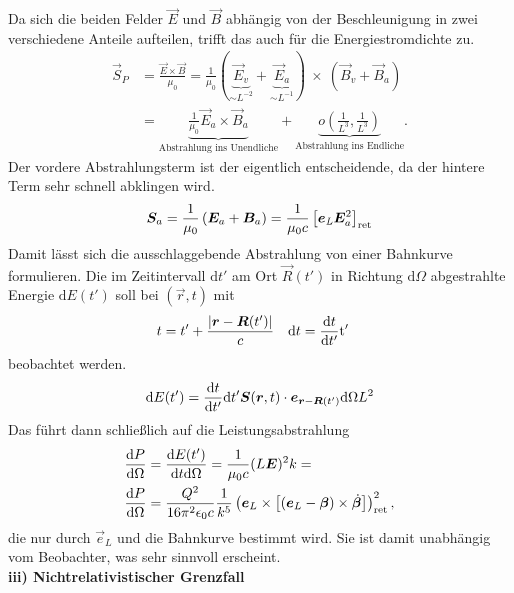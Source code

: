 Da sich die beiden Felder $\vec{E}$ und $\vec{B}$ abhängig von der Beschleunigung in zwei verschiedene Anteile aufteilen, trifft das auch für die Energiestromdichte zu.
\begin{align*}
\vec{S}_P &= \frac{\vec{E}\times\vec{B}}{\mu_0} = \frac{1}{\mu_0}(\underbrace{\vec{E}_v}_{\sim L^{-2}}+\underbrace{\vec{E}_a}_{\sim L^{-1}}) \ \times \ (\vec{B}_v+\vec{B}_a) \\
&=\underbrace{\frac{1}{\mu_0}\vec{E}_a\times\vec{B}_a}_{\text{Abstrahlung ins Unendliche}} + \underbrace{o\left(\frac{1}{L^3},\frac{1}{L^3}\right)}_{\text{Abstrahlung ins Endliche}}.
\end{align*}
Der vordere Abstrahlungsterm ist der eigentlich entscheidende, da der hintere Term sehr schnell abklingen wird.
\begin{equation*}
\vec{S}_a = \frac{1}{\mu_0}\left(\vec{E}_a+\vec{B}_a\right) = 
\frac{1}{\mu_0c}\left[\vec{e}_\text{\textit{L}}\vec{E}_a^2\right]_{\text{ret}}
\end{equation*}
Damit lässt sich die ausschlaggebende Abstrahlung von einer Bahnkurve  formulieren.  Die im Zeitintervall $\mathrm{d}t'$ am Ort $\vec{R}(t')$ in Richtung $\mathrm{d}\Omega$ abgestrahlte Energie $\mathrm{d}E(t')$ soll bei $(\vec{r},t)$ mit
\begin{align*}
t &= t' + \frac{|\vec{r}-\vec{R}(t')|}{c} & \mathrm{d}t &= \diff{t}{t'}\mathrm{t'}
\end{align*} 
beobachtet werden. 
\begin{equation*}
\mathrm{d}E(t') = \diff{t}{t'}\mathrm{d}t'\vec{S}(\vec{r},t)\cdot\vec{e}_{\vec{r}-\vec{R}(t')}\mathrm{d}\Omega L^2
\end{equation*}
Das führt dann schließlich auf die Leistungsabstrahlung
\begin{align*}
\diff{P}{\Omega}&=\frac{\mathrm{d}E(t')}{\mathrm{d}t\mathrm{d}\Omega}=\frac{1}{\mu_0c}(L\vec{E})^2k = \\
\diff{P}{\Omega}&=\frac{Q^2}{16\pi^2\epsilon_0c}\frac{1}{k^5}\left(\vec{e}_L\times\left[(\vec{e}_L-\vec{\beta})\times\dot{\vec{\beta}}\right]\right)^2_\text{ret},
\end{align*}
die nur durch $\vec{e}_L$ und die Bahnkurve bestimmt wird. Sie ist damit unabhängig vom Beobachter, was sehr sinnvoll erscheint. \\

\textbf{iii) \quad Nichtrelativistischer Grenzfall}\\

